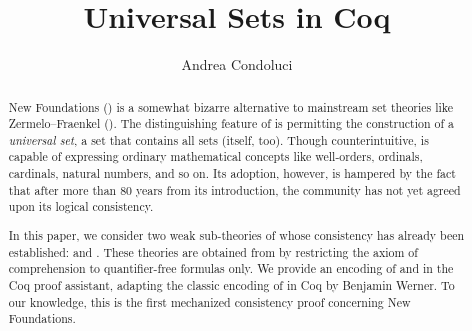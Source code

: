 \documentclass[sigplan,10pt,anonymous,review]{acmart}\settopmatter{printfolios=true,printccs=false,printacmref=false}
\begin{document}
\title{Universal Sets in Coq}

\author{Andrea Condoluci}


\begin{abstract}
New Foundations (\NF) is a somewhat bizarre alternative to mainstream set theories like Zermelo–Fraenkel (\ZF). The distinguishing feature of \NF{} is permitting the construction of a \emph{universal set}, \ie{} a set that contains all sets (itself, too). Though counterintuitive, \NF{} is capable of expressing ordinary mathematical concepts like well-orders, ordinals, cardinals, natural numbers, and so on. Its adoption, however, is hampered by the fact that after more than 80 years from its introduction, the community has not yet agreed upon its logical consistency.
  
In this paper, we consider two weak sub-theories of \NF{} whose consistency has already been established: \NFTWO{} and \NFO. These theories are obtained from \NF{} by restricting the axiom of comprehension to quantifier-free formulas only. We provide an encoding of \NFTWO{} and \NFO{} in the Coq proof assistant, adapting the classic encoding of \ZF{} in Coq by Benjamin Werner. To our knowledge, this is the first mechanized consistency proof concerning New Foundations.
\end{abstract}
\end{document}
